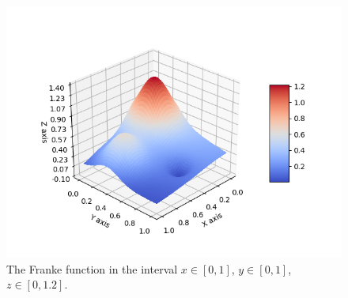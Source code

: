  \begin{figure} [H]
 	\centering
 	\includegraphics[scale=0.8]{../plots/franke.png}
 	\caption{The Franke function in the interval $x\in[0,1]$, $y\in[0,1]$, $z\in[0, 1.2]$.}
 	\label{fig:franke}
 \end{figure}


